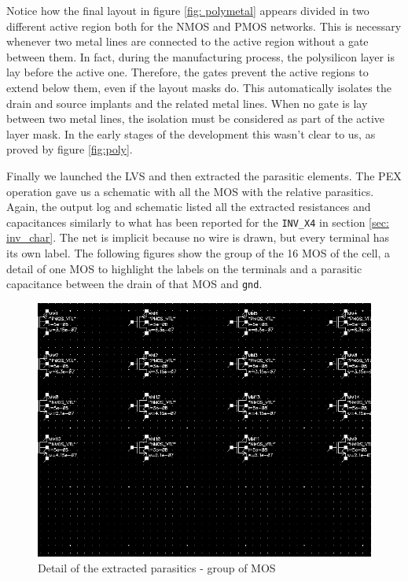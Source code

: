 \documentclass[a4paper]{article}
\newcommand{\inv}{\texttt{INV\_X4}\xspace}
\begin{document}
Notice how the final layout in figure \ref{fig: polymetal} appears divided in two different active region both for the NMOS and PMOS networks. This is necessary whenever two metal lines are connected to the active region without a gate between them. In fact, during the manufacturing process, the polysilicon layer is lay before the active one. Therefore, the gates prevent the active regions to extend below them, even if the layout masks do. This automatically isolates the drain and source implants and the related metal lines. When no gate is lay between two metal lines, the isolation must be considered as part of the active layer mask. In the early stages of the development this wasn't clear to us, as proved by figure \ref{fig:poly}.

Finally we launched the LVS and then extracted the parasitic elements. The PEX operation gave us a schematic with all the MOS with the relative parasitics. Again, the output log and schematic listed all the extracted resistances and capacitances similarly to what has been reported for the \inv in section \ref{sec: inv_char}. The net is implicit because no wire is drawn, but every terminal has its own label. The following figures show the group of the 16 MOS of the cell, a detail of one MOS to highlight the labels on the terminals and a parasitic capacitance between the drain of that MOS and \texttt{gnd}.

\begin{figure}[H]
      \centering
       \includegraphics[width=12cm]{./Images/HA/HAX1_PEX.png}
\caption{Detail of the extracted parasitics - group of MOS}
\label{fig: PEX0}
\end{figure}
\end{document}
